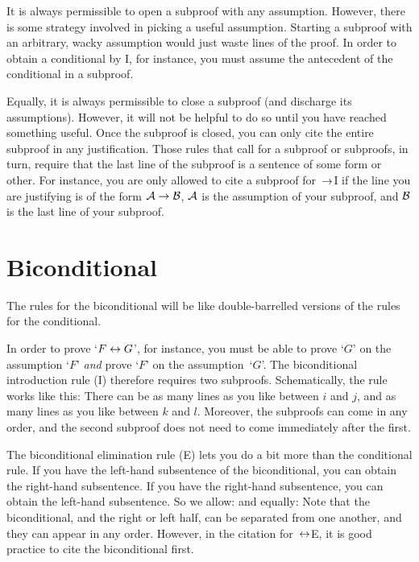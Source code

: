 It is always permissible to open a subproof with any assumption. However, there is some strategy involved in picking a useful assumption. Starting a subproof with an arbitrary, wacky assumption would just waste lines of the proof. In order to obtain a conditional by {\eif}I, for instance, you must assume the antecedent of the conditional in a subproof.

Equally, it is always permissible to close a subproof (and discharge
its assumptions). However, it will not be helpful to do so until you
have reached something useful. Once the subproof is closed, you can
only cite the entire subproof in any justification. Those rules that
call for a subproof or subproofs, in turn, require that the last line
of the subproof is a sentence of some form or other. For instance, you
are only allowed to cite a subproof for~$\rightarrow$I if the line you are
justifying is of the form $\mathcal{A} \rightarrow \mathcal{B}$, $\mathcal{A}$ is
the assumption of your subproof, and $\mathcal{B}$ is the last line of
your subproof.


\section{Biconditional}

The rules for the biconditional will be like double-barrelled versions
of the rules for the conditional.

In order to prove `$F \leftrightarrow G$', for instance, you must be able to
prove `$G$' on the assumption `$F$' \emph{and} prove `$F$' on the
assumption~`$G$'. The biconditional introduction rule ({\eiff}I)
therefore requires two subproofs. Schematically, the rule works like
this: 
There can be as many lines as you like between $i$ and $j$, and as many lines as you like between $k$ and $l$. Moreover, the subproofs can come in any order, and the second subproof does not need to come immediately after the first.

The biconditional elimination rule ({\eiff}E) lets you do a bit more than the conditional rule. If you have the left-hand subsentence of the biconditional, you can obtain the right-hand subsentence. If you have the right-hand subsentence, you can obtain the left-hand subsentence. So we allow:
and equally:
Note that the biconditional, and the right or left half, can be
separated from one another, and they can appear in any order. However,
in the citation for~$\leftrightarrow$E, it is good practice to cite the
biconditional first.

